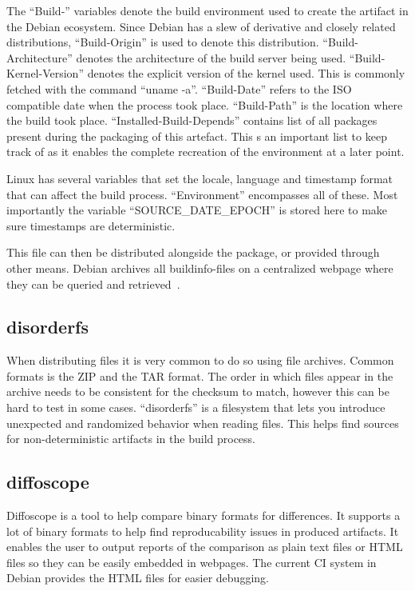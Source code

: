 \documentclass[../Main/thesis.tex]{subfiles}
\begin{document}
The ``Build-'' variables denote the build environment used to create the
artifact in the Debian ecosystem. Since Debian has a slew of derivative and
closely related distributions, ``Build-Origin'' is used to denote this
distribution.  ``Build-Architecture'' denotes the architecture of the build
server being used.  ``Build-Kernel-Version'' denotes the explicit  version of
the kernel used. This is commonly fetched with the command ``uname -a''.
``Build-Date'' refers to the ISO compatible date when the process took place.
``Build-Path'' is the location where the build took place.
``Installed-Build-Depends'' contains list of all packages present during the
packaging of this artefact. This s an important list to keep track of as it
enables the complete recreation of the environment at a later point.

Linux has several variables that set the locale, language and timestamp format
that can affect the build process. ``Environment'' encompasses all of these.
Most importantly the variable ``SOURCE\_DATE\_EPOCH'' is stored here to make
sure timestamps are deterministic.

This file can then be distributed alongside the package, or provided through
other means. Debian archives all buildinfo-files on a centralized webpage where
they can be queried and retrieved~\cite{buildinfo-debian}.

\subsection*{disorderfs}
When distributing files it is very common to do so using file archives. Common
formats is the ZIP and the TAR format. The order in which files appear in the
archive needs to be consistent for the checksum to match, however this can be
hard to test in some cases. ``disorderfs'' is a filesystem that lets you
introduce unexpected and randomized behavior when reading files. This helps find
sources for non-deterministic artifacts in the build process.


\subsection*{diffoscope}
Diffoscope is a tool to help compare binary formats for differences. It supports
a lot of binary formats to help find reproducability issues in produced
artifacts. It enables the user to output reports of the comparison as plain text
files or HTML files so they can be easily embedded in webpages. The current CI
system in Debian provides the HTML files for easier debugging.
\end{document}
